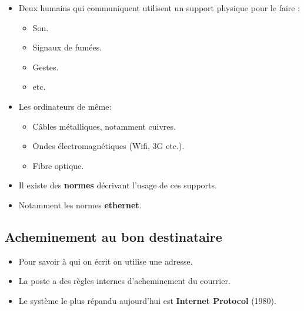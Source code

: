 \begin{slide}
	\begin{itemize}
		\item Deux humains qui communiquent utilisent un support physique pour le faire :
 			\begin{itemize}
				\item Son. 
				\item Signaux de fumées.
				\item Gestes.
				\item etc.
			\end{itemize}
		\item Les ordinateurs de même:
			\begin{itemize}
				\item Câbles métalliques, notamment cuivres.
				\item Ondes électromagnétiques (Wifi, 3G etc.).
				\item Fibre optique. %
			\end{itemize} 
		\item Il existe des \textbf{normes} décrivant l'usage de ces supports.
		\item Notamment les normes \textbf{ethernet}.
	\end{itemize}
\end{slide}


\subsection{Acheminement au bon destinataire}

\begin{slide}
	\begin{itemize}
		\item Pour savoir à qui on écrit on utilise une adresse.
		\item La poste a des règles internes d'acheminement du courrier.
		\item Le système le plus répandu aujourd'hui est \textbf{Internet Protocol} (1980).
	\end{itemize}
\end{slide}

